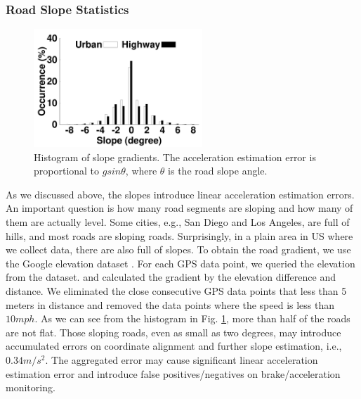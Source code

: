 \subsubsection{Road Slope Statistics}

\begin{figure}[!htbp]
\begin{center}
\includegraphics[width=2.5in, angle=0]{Figs/DriveSense/slopeaware/degrees.pdf}
\caption{Histogram of slope gradients. The acceleration estimation error is 
proportional to $gsin\theta$, where $\theta$ is the road slope angle.}
\label{slopegradients}
\vspace{-0.4cm}
\end{center}
\end{figure}


As we discussed above, the slopes introduce linear acceleration estimation errors.
An important question is how many road segments are sloping and
how many of them are actually level. 
Some cities, e.g., San Diego and Los Angeles, are full of hills, 
and most roads are sloping roads.
Surprisingly, in a plain area in US where we collect data, 
there are also full of slopes. 
To obtain the road gradient, we use the Google elevation dataset \cite{googleelevation}. 
For each GPS data point, we queried the elevation from the dataset. 
and calculated the gradient by the elevation difference
and distance.
We eliminated the close consecutive GPS data points that less than 5 meters in distance and removed the data points where the speed is less than $10mph$.
As we can see from the histogram in Fig. \ref{slopegradients}, 
more than half of the roads are not flat.
Those sloping roads, even as small as two degrees, may introduce accumulated
errors on coordinate alignment and further slope estimation, i.e., $0.34m/s^2$.
The aggregated error may cause significant linear acceleration estimation error
and introduce false positives/negatives on brake/acceleration monitoring. 




